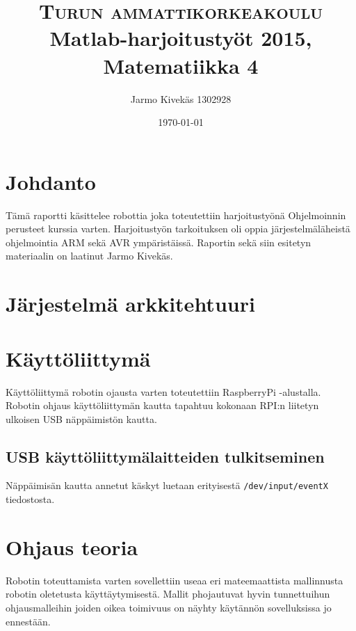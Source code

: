 \documentclass[]{article} %
\title{	
\normalfont \normalsize 
\textsc{Turun ammattikorkeakoulu} \\ [25pt] %
\huge Matlab-harjoitustyöt 2015, Matematiikka 4\\ %
}
\author{
Jarmo Kivekäs 1302928
}
\date{\normalsize\today} %
\numberwithin{equation}{section}
\numberwithin{figure}{section}
\numberwithin{table}{section}
\begin{document}
\maketitle
\tableofcontents

\newpage












\section{Johdanto}
\label{sec:Johdanto}


Tämä raportti käsittelee robottia joka toteutettiin harjoitustyönä Ohjelmoinnin perusteet kurssia varten.
Harjoitustyön tarkoituksen oli oppia järjestelmäläheistä ohjelmointia ARM sekä AVR ympäristäissä.
Raportin sekä siin esitetyn materiaalin on laatinut Jarmo Kivekäs.


\section{Järjestelmä arkkitehtuuri}
\label{sec:Jarjestelma arkkitehtuuri}

\section{Käyttöliittymä}
\label{sec:Kayttoliittyma}

Käyttöliittymä robotin ojausta varten toteutettiin RaspberryPi -alustalla.
Robotin ohjaus käyttöliittymän kautta tapahtuu kokonaan RPI:n liitetyn ulkoisen USB näppäimistön kautta.

\subsection{USB käyttöliittymälaitteiden tulkitseminen}
\label{sub:USB kayttoliittymalaitteiden tulkitseminen}

Näppäimisän kautta annetut käskyt luetaan erityisestä \verb+/dev/input/eventX+ tiedostosta. 

\section{Ohjaus teoria}
\label{sec:Ohjaus teoria}

Robotin toteuttamista varten sovellettiin useaa eri mateemaattista mallinnusta robotin oletetusta käyttäytymisestä.
Mallit phojautuvat hyvin tunnettuihun ohjausmalleihin joiden oikea toimivuus on näyhty käytännön sovelluksissa jo ennestään.
 
\end{document}

